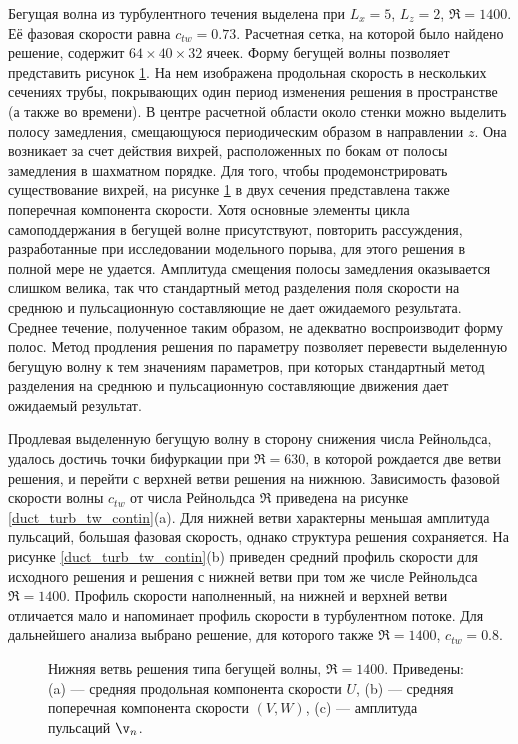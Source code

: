 Бегущая волна из турбулентного течения выделена при $L_x = 5$, $L_z = 2$, $\Re = 1400$. Её фазовая скорости равна $c_{tw} = 0.73$. Расчетная сетка, на которой было найдено решение, содержит $64 \times 40 \times 32$ ячеек. Форму бегущей волны позволяет представить рисунок \ref{duct_turb_tw_pic}. На нем изображена продольная скорость в нескольких сечениях трубы, покрывающих один период изменения решения в пространстве (а также во времени). В центре расчетной области около стенки можно выделить полосу замедления, смещающуюся периодическим образом в направлении $z$. Она возникает за счет действия вихрей, расположенных по бокам от полосы замедления в шахматном порядке. Для того, чтобы продемонстрировать существование вихрей, на рисунке \ref{duct_turb_tw_pic} в двух сечения представлена также поперечная компонента скорости. Хотя основные элементы цикла самоподдержания в бегущей волне присутствуют, повторить рассуждения, разработанные при исследовании модельного порыва, для этого решения в полной мере не удается. Амплитуда смещения полосы замедления оказывается слишком велика, так что стандартный метод разделения поля скорости на среднюю и пульсационную составляющие не дает ожидаемого результата. Среднее течение, полученное таким образом, не адекватно воспроизводит форму полос. Метод продления решения по параметру позволяет перевести выделенную бегущую волну к тем значениям параметров, при которых стандартный метод разделения на среднюю и пульсационную составляющие движения дает ожидаемый результат. 




Продлевая выделенную бегущую волну в сторону снижения числа Рейнольдса, удалось достичь точки бифуркации при $\Re = 630$, в которой рождается две ветви решения, и перейти с верхней ветви решения на нижнюю. Зависимость фазовой скорости волны $c_{tw}$ от числа Рейнольдса $\Re$ приведена на рисунке \ref{duct_turb_tw_contin}(a). Для нижней ветви характерны меньшая амплитуда пульсаций, большая фазовая скорость, однако структура решения сохраняется. На рисунке \ref{duct_turb_tw_contin}(b) приведен средний профиль скорости для исходного решения и решения с нижней ветви при том же числе Рейнольдса $\Re = 1400$. Профиль скорости наполненный, на нижней и верхней ветви отличается мало и напоминает профиль скорости в турбулентном потоке. Для дальнейшего анализа выбрано решение, для которого также $\Re = 1400$, $c_{tw} = 0.8$. 

\begin{figure}
\caption{Нижняя ветвь решения типа бегущей волны, $\Re = 1400$. Приведены: (a) --- средняя продольная компонента скорости $U$, (b) --- средняя поперечная компонента скорости $(V,W)$, (c) --- амплитуда пульсаций $\v_n$.} 
\label{duct_turb_tw_pic}
\end{figure}

